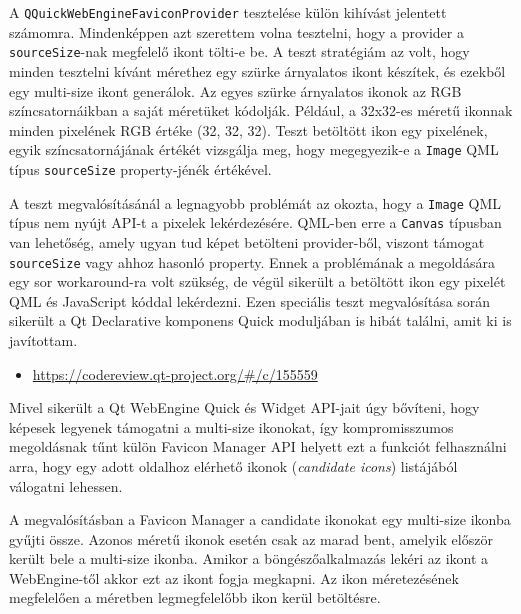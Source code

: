 \documentclass[12pt]{report}
\let\origurl\url
\renewcommand{\url}[1]{%
    \textcolor{blue}{\origurl{#1}}
}
\newcommand{\gerrit}[1]{%
    \textcolor{qtgreen}{\origurl{https://codereview.qt-project.org/\#/c/#1}}
}
\begin{document}
A \texttt{QQuickWebEngineFaviconProvider} tesztelése külön kihívást jelentett számomra.
Mindenképpen azt szerettem volna tesztelni, hogy a provider a \texttt{sourceSize}-nak
megfelelő ikont tölti-e be. A teszt stratégiám az volt, hogy minden tesztelni kívánt mérethez
egy szürke árnyalatos ikont készítek, és ezekből egy multi-size ikont generálok. Az egyes
szürke árnyalatos ikonok az RGB színcsatornáikban a saját méretüket kódolják. Például, a
32x32-es méretű ikonnak minden pixelének RGB értéke (32, 32, 32). Teszt betöltött ikon
egy pixelének, egyik színcsatornájának értékét vizsgálja meg, hogy megegyezik-e
a \texttt{Image} QML típus \texttt{sourceSize} property-jénék értékével.

A teszt megvalósításánál a legnagyobb problémát az okozta, hogy a \texttt{Image} QML
típus nem nyújt API-t a pixelek lekérdezésére. QML-ben erre a \texttt{Canvas} típusban
van lehetőség, amely ugyan tud képet betölteni provider-ből, viszont támogat
\texttt{sourceSize} vagy ahhoz hasonló property. Ennek a problémának a megoldására egy
sor workaround-ra volt szükség, de végül sikerült a betöltött ikon egy pixelét QML és
JavaScript kóddal lekérdezni. Ezen speciális teszt megvalósítása során sikerült a
Qt Declarative komponens Quick moduljában is hibát találni, amit ki is javítottam.

\begin{center}
    \begin{reviewbox}
        \begin{itemize}
            \renewcommand{\labelitemi}{\textcolor{qtgreen}{$\blacktriangleright$}}
            \item \gerrit{155559}
        \end{itemize}
    \end{reviewbox}
\end{center}

Mivel sikerült a Qt WebEngine Quick és Widget API-jait úgy bővíteni, hogy képesek legyenek
támogatni a multi-size ikonokat, így kompromisszumos megoldásnak tűnt külön Favicon Manager
API helyett ezt a funkciót felhasználni arra, hogy egy adott oldalhoz elérhető ikonok
(\textit{candidate icons}) listájából válogatni lehessen.

A megvalósításban a Favicon Manager a candidate ikonokat egy multi-size ikonba gyűjti össze.
Azonos méretű ikonok esetén csak az marad bent, amelyik először került bele a multi-size
ikonba. Amikor a böngészőalkalmazás lekéri az ikont a WebEngine-től akkor ezt az ikont
fogja megkapni. Az ikon méretezésének megfelelően a méretben legmegfelelőbb ikon kerül
betöltésre.
\end{document}
